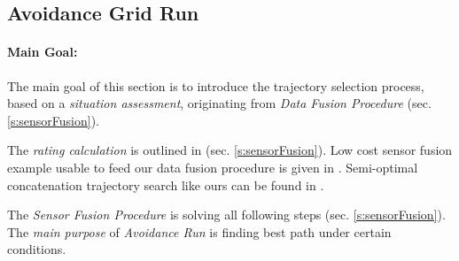 \subsection{Avoidance Grid Run}\label{s:aviudabceGridRun}
\paragraph{Main Goal:} The main goal of this section is to introduce the trajectory selection process, based on a \emph{situation assessment}, originating from \emph{Data Fusion Procedure} (sec. \ref{s:sensorFusion}). 

\begin{note}
    The \emph{rating calculation} is outlined in (sec. \ref{s:sensorFusion}). Low cost sensor fusion example usable to feed our data fusion procedure is given in \cite{sabatini2013low}. Semi-optimal concatenation trajectory search  like ours can be found in \cite{shaw1998using}.
\end{note}

\begin{note}
    The \emph{Sensor Fusion Procedure} is solving all following steps (sec. \ref{s:sensorFusion}). The \emph{main purpose} of \emph{Avoidance Run} is finding best path under certain conditions.
\end{note}

